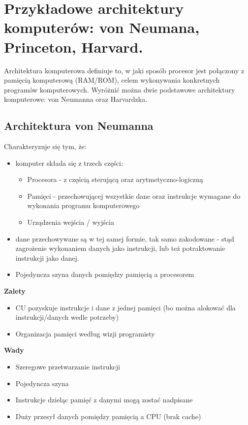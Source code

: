 \documentclass[../main.tex]{subfiles}
\begin{document}
\section{Przykładowe architektury komputerów: von Neumana, Princeton, Harvard.}

Architektura komputerowa definiuje to, w jaki sposób procesor jest połączony z pamięcią komputerową (RAM/ROM), celem wykonywania konkretnych programów komputerowych. Wyróżnić można dwie podstawowe architektury komputerowe: von Neumanna oraz Harvardzka.

\subsection{Architektura von Neumanna}
Charakteryzuje się tym, że:
\begin{itemize}
    \item komputer składa się z trzech części:
    \begin{itemize}
        \item Procesora - z częścią sterującą oraz arytmetyczno-logiczną
        \item Pamięci - przechowującej wszystkie dane oraz instrukcje wymagane do wykonania programu komputerowego
        \item Urządzenia wejścia / wyjścia
    \end{itemize}
    \item dane przechowywane są w tej samej formie, tak samo zakodowane - stąd zagrożenie wykonaniem danych jako instrukcji, lub też potraktowanie instrukcji jako danej.
    \item Pojedyncza szyna danych pomiędzy pamięcią a procesorem
\end{itemize}

\textbf{Zalety}
\begin{itemize}
    \item CU pozyskuje instrukcje i dane z jednej pamięci (bo można alokować dla instrukcji/danych wedle potrzeby)
    \item Organizacja pamięci według wizji programisty
\end{itemize}

\textbf{Wady}
\begin{itemize}
    \item Szeregowe przetwarzanie instrukcji
    \item Pojedyncza szyna
    \item Instrukcje dzieląc pamięć z danymi mogą zostać nadpisane
    \item Duży przesył danych pomiędzy pamięcią a CPU (brak cache)
\end{itemize}
\end{document}
